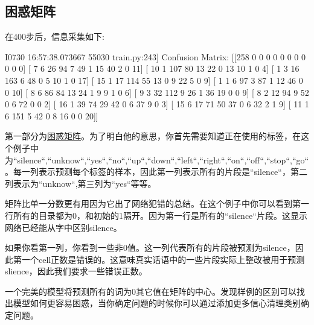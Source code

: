 \subsection{困惑矩阵}
在400步后，信息采集如下:
\begin{pythoncode}
I0730 16:57:38.073667   55030 train.py:243] Confusion Matrix:
 [[258   0   0   0   0   0   0   0   0   0   0   0]
 [  7   6  26  94   7  49   1  15  40   2   0  11]
 [ 10   1 107  80  13  22   0  13  10   1   0   4]
 [  1   3  16 163   6  48   0   5  10   1   0  17]
 [ 15   1  17 114  55  13   0   9  22   5   0   9]
 [  1   1   6  97   3  87   1  12  46   0   0  10]
 [  8   6  86  84  13  24   1   9   9   1   0   6]
 [  9   3  32 112   9  26   1  36  19   0   0   9]
 [  8   2  12  94   9  52   0   6  72   0   0   2]
 [ 16   1  39  74  29  42   0   6  37   9   0   3]
 [ 15   6  17  71  50  37   0   6  32   2   1   9]
 [ 11   1   6 151   5  42   0   8  16   0   0  20]]
\end{pythoncode}
第一部分为\href{https://www.tensorflow.org/api_docs/python/tf/confusion_matrix}{困惑矩阵}。为了明白他的意思，你首先需要知道正在使用的标签，在这个例子中为``silence``,``unknow``,``yes``,``no``,``up``,``down``,``left``,``right``,``on``,``off``,``stop``,``go``。每一列表示预测每个标签的样本，因此第一列表示所有的片段是``silence``，第二列表示为``unknow``,第三列为``yes``等等。

矩阵比单一分数更有用因为它出了网络犯错的总结。在这个例子中你可以看到第一行所有的目录都为0，和初始的1隔开。因为第一行是所有的``silence``片段。这显示网络已经能从字中区别silence。

如果你看第一列，你看到一些非0值。这一列代表所有的片段被预测为silence，因此第一个cell正数是错误的。这意味真实话语中的一些片段实际上整改被用于预测slience，因此我们要求一些错误正数。

一个完美的模型将预测所有的词为0其它值在矩阵的中心。发现样例的区别可以找出模型如何更容易困惑，当你确定问题的时候你可以通过添加更多信心清理类别确定问题。
